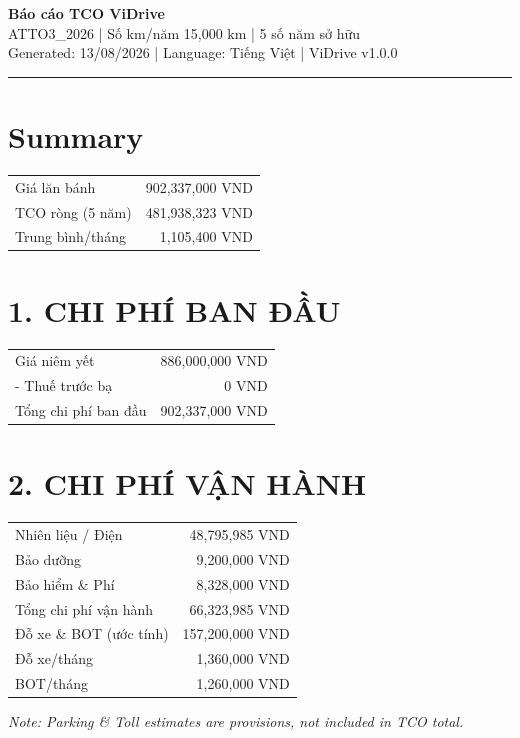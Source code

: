 \documentclass[11pt,a4paper]{article}
\begin{document}
\thispagestyle{empty}

\begin{center}
    {\LARGE \textbf{\color{ViDriveBlue} Báo cáo TCO ViDrive}}\\[0.3cm]
    {\Large ATTO3\_2026 | Số km/năm 15,000 km | 5 số năm sở hữu}\\[0.2cm]
    {\normalsize Generated: 13/08/2026 | Language: Tiếng Việt | ViDrive v1.0.0}
\end{center}
\vspace{0.5cm}
\hrule
\vspace{0.5cm}
\section*{Summary}
\begin{tabular}{l r}
\toprule
Giá lăn bánh & 902,337,000 VND \\
TCO ròng (5 năm) & 481,938,323 VND \\
Trung bình/tháng & 1,105,400 VND \\
\bottomrule
\end{tabular}
\vspace{0.3cm}\section*{1. CHI PHÍ BAN ĐẦU}
\begin{tabular}{l r}
\toprule
Giá niêm yết & 886,000,000 VND \\
 - Thuế trước bạ & 0 VND \\
Tổng chi phí ban đầu & 902,337,000 VND \\
\bottomrule
\end{tabular}
\vspace{0.3cm}\section*{2. CHI PHÍ VẬN HÀNH}
\begin{tabular}{l r}
\toprule
Nhiên liệu / Điện & 48,795,985 VND \\
Bảo dưỡng & 9,200,000 VND \\
Bảo hiểm \& Phí & 8,328,000 VND \\
Tổng chi phí vận hành & 66,323,985 VND \\
Đỗ xe \& BOT (ước tính) & 157,200,000 VND \\
  Đỗ xe/tháng & 1,360,000 VND \\
  BOT/tháng & 1,260,000 VND \\
\bottomrule
\end{tabular}
\vspace{0.3cm}\textit{Note: Parking \& Toll estimates are provisions, not included in TCO total.}
\end{document}
